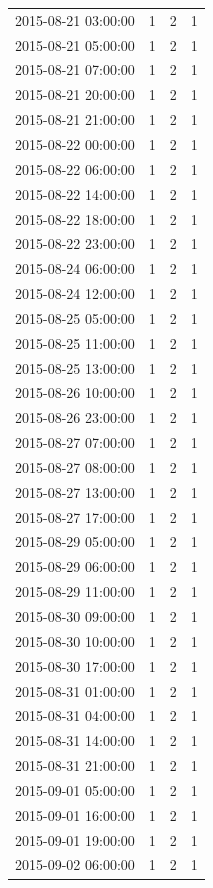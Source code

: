\begin{tabular}{lrrr}
2015-08-21 03:00:00 & 1 & 2 & 1 \\
2015-08-21 05:00:00 & 1 & 2 & 1 \\
2015-08-21 07:00:00 & 1 & 2 & 1 \\
2015-08-21 20:00:00 & 1 & 2 & 1 \\
2015-08-21 21:00:00 & 1 & 2 & 1 \\
2015-08-22 00:00:00 & 1 & 2 & 1 \\
2015-08-22 06:00:00 & 1 & 2 & 1 \\
2015-08-22 14:00:00 & 1 & 2 & 1 \\
2015-08-22 18:00:00 & 1 & 2 & 1 \\
2015-08-22 23:00:00 & 1 & 2 & 1 \\
2015-08-24 06:00:00 & 1 & 2 & 1 \\
2015-08-24 12:00:00 & 1 & 2 & 1 \\
2015-08-25 05:00:00 & 1 & 2 & 1 \\
2015-08-25 11:00:00 & 1 & 2 & 1 \\
2015-08-25 13:00:00 & 1 & 2 & 1 \\
2015-08-26 10:00:00 & 1 & 2 & 1 \\
2015-08-26 23:00:00 & 1 & 2 & 1 \\
2015-08-27 07:00:00 & 1 & 2 & 1 \\
2015-08-27 08:00:00 & 1 & 2 & 1 \\
2015-08-27 13:00:00 & 1 & 2 & 1 \\
2015-08-27 17:00:00 & 1 & 2 & 1 \\
2015-08-29 05:00:00 & 1 & 2 & 1 \\
2015-08-29 06:00:00 & 1 & 2 & 1 \\
2015-08-29 11:00:00 & 1 & 2 & 1 \\
2015-08-30 09:00:00 & 1 & 2 & 1 \\
2015-08-30 10:00:00 & 1 & 2 & 1 \\
2015-08-30 17:00:00 & 1 & 2 & 1 \\
2015-08-31 01:00:00 & 1 & 2 & 1 \\
2015-08-31 04:00:00 & 1 & 2 & 1 \\
2015-08-31 14:00:00 & 1 & 2 & 1 \\
2015-08-31 21:00:00 & 1 & 2 & 1 \\
2015-09-01 05:00:00 & 1 & 2 & 1 \\
2015-09-01 16:00:00 & 1 & 2 & 1 \\
2015-09-01 19:00:00 & 1 & 2 & 1 \\
2015-09-02 06:00:00 & 1 & 2 & 1 \\

\end{tabular}
